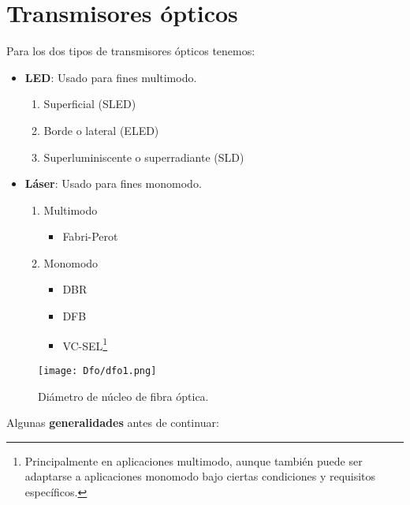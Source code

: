 \documentclass[
	12pt, %
	fleqn, %
	a4paper, %
	oneside, %
]{LegrandOrangeBook}
\begin{document}
\chapter{Transmisores ópticos}
Para los dos tipos de transmisores ópticos tenemos:
\begin{itemize}
\item \textbf{LED}: Usado para fines multimodo.
\begin{enumerate}
\item Superficial (SLED)
\item Borde o lateral (ELED)
\item Superluminiscente o superradiante (SLD)
\end{enumerate}

\item \textbf{Láser}: Usado para fines monomodo.
\begin{enumerate}
\item Multimodo
\begin{itemize}
\item Fabri-Perot
\end{itemize}
\item Monomodo
\begin{itemize}
\item DBR
\item DFB
\item VC-SEL\footnote{Principalmente en aplicaciones multimodo, aunque también puede ser adaptarse a aplicaciones monomodo bajo ciertas condiciones y requisitos específicos.}
\end{itemize}
\end{enumerate}
\end{itemize}
\begin{figure}[H]
\centering
\texttt{[image: Dfo/dfo1.png]}
\caption{Diámetro de núcleo de fibra óptica.}
\end{figure}
Algunas \textbf{generalidades} antes de continuar:
\end{document}
